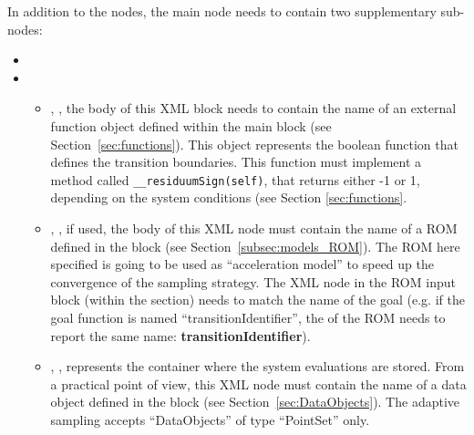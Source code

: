 In addition to the  nodes, the main
 node needs to contain two supplementary
sub-nodes:

\begin{itemize}
  \item \convergenceDescription
  \item {}
    \begin{itemize}
      \item {}, ,  the
        body of this XML block needs to contain the name of an external
        function object defined within the  main block (see
        Section~\ref{sec:functions}).
        This object represents the boolean function that defines the transition
        boundaries.
        This function must implement a method called
        \texttt{\_\_residuumSign(self)}, that returns either -1 or 1, depending
        on the system conditions (see Section \ref{sec:functions}.
      \item {}, , if used, the
        body of this XML node must contain the name of a ROM defined in the
         block (see Section~\ref{subsec:models_ROM}). The ROM
        here specified is going to be used as ``acceleration model'' to speed up the
        convergence of the sampling strategy. The  XML node in the ROM
        input block (within the  section) needs to match the name of the goal
         (e.g. if the goal function is named ``transitionIdentifier'', the  of the
        ROM needs to report the same name: \textbf{transitionIdentifier}).
      \item {}, ,
        represents the container where the system evaluations are stored.
        From a practical point of view, this XML node must contain the name of
        a data object defined in the  block (see
        Section~\ref{sec:DataObjects}).
        The adaptive sampling accepts ``DataObjects'' of type
        ``PointSet'' only.
    \end{itemize}
\end{itemize}

